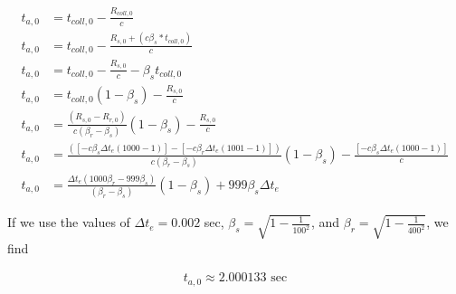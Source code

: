 \documentclass[10pt]{article}
\begin{document}
\begin{align}
	t_{a,0} &= t_{coll,0} - \frac{R_{coll,0}}{c}\\
	t_{a,0} &= t_{coll,0} - \frac{R_{s,0} + (c\beta_s*t_{coll,0})}{c}\\
	t_{a,0} &= t_{coll,0} - \frac{R_{s,0}}{c} - \beta_st_{coll,0}\\
	t_{a,0} &= t_{coll,0}(1-\beta_s) - \frac{R_{s,0}}{c}\\
	t_{a,0} &= \frac{(R_{s,0}-R_{r,0})}{c(\beta_r - \beta_s)}(1-\beta_s) - \frac{R_{s,0}}{c}\\
	t_{a,0} &= \frac{( [-c\beta_s\Delta t_e (1000-1)] - [-c\beta_r\Delta t_e (1001-1)] )}{c(\beta_r - \beta_s)}(1-\beta_s) - \frac{[-c\beta_s\Delta t_e (1000-1)]}{c}\\
	t_{a,0} &= \frac{\Delta t_e(1000\beta_r - 999\beta_s)}{(\beta_r - \beta_s)}(1-\beta_s) + 999\beta_s\Delta t_e 
\end{align}

If we use the values of $\Delta t_e = 0.002$ sec, $\beta_s = \sqrt{1-\frac{1}{100^2}}$, and $\beta_r = \sqrt{1-\frac{1}{400^2}}$, we find 

\begin{align}
	t_{a,0} \approx 2.000133 \text{ sec}
\end{align}
\end{document}
